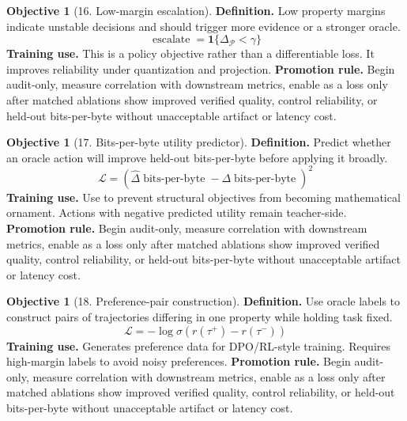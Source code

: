 \documentclass[11pt]{article}
\theoremstyle{definition}
\newtheorem{objective}[theorem]{Objective}
\theoremstyle{remark}
\newcommand{\loss}{\mathcal{L}}
\newcommand{\Prop}{\mathcal{P}}
\newcommand{\bits}{\operatorname{bits\mbox{-}per\mbox{-}byte}}
\numberwithin{equation}{section}
\begin{document}
\begin{objective}[16. Low-margin escalation]
\textbf{Definition.} Low property margins indicate unstable decisions and should trigger more evidence or a stronger oracle.
\begin{equation}
    \operatorname{escalate}=\mathbf 1\{\Delta_{\Prop}<\gamma\}
\end{equation}
\textbf{Training use.} This is a policy objective rather than a differentiable loss. It improves reliability under quantization and projection.
\textbf{Promotion rule.} Begin audit-only, measure correlation with downstream metrics, enable as a loss only after matched ablations show improved verified quality, control reliability, or held-out bits-per-byte without unacceptable artifact or latency cost.
\end{objective}


\begin{objective}[17. Bits-per-byte utility predictor]
\textbf{Definition.} Predict whether an oracle action will improve held-out bits-per-byte before applying it broadly.
\begin{equation}
    \loss=\left(\hat \Delta\bits-\Delta\bits\right)^2
\end{equation}
\textbf{Training use.} Use to prevent structural objectives from becoming mathematical ornament. Actions with negative predicted utility remain teacher-side.
\textbf{Promotion rule.} Begin audit-only, measure correlation with downstream metrics, enable as a loss only after matched ablations show improved verified quality, control reliability, or held-out bits-per-byte without unacceptable artifact or latency cost.
\end{objective}


\begin{objective}[18. Preference-pair construction]
\textbf{Definition.} Use oracle labels to construct pairs of trajectories differing in one property while holding task fixed.
\begin{equation}
    \loss=-\log\sigma(r(\tau^+)-r(\tau^-))
\end{equation}
\textbf{Training use.} Generates preference data for DPO/RL-style training. Requires high-margin labels to avoid noisy preferences.
\textbf{Promotion rule.} Begin audit-only, measure correlation with downstream metrics, enable as a loss only after matched ablations show improved verified quality, control reliability, or held-out bits-per-byte without unacceptable artifact or latency cost.
\end{objective}
\end{document}
